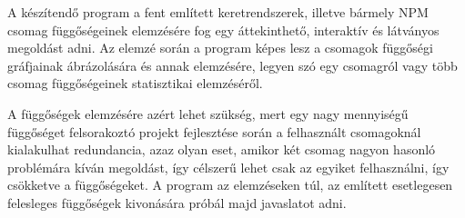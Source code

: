 A készítendő program a fent említett keretrendszerek, illetve bármely NPM csomag függőségeinek elemzésére fog egy áttekinthető, interaktív és látványos megoldást adni. Az elemzé során a program képes lesz a csomagok függőségi gráfjainak ábrázolására és annak elemzésére, legyen szó egy csomagról vagy több csomag függőségeinek statisztikai elemzéséről.

A függőségek elemzésére azért lehet szükség, mert egy nagy mennyiségű függőséget felsorakoztó projekt fejlesztése során a felhasznált csomagoknál kialakulhat redundancia, azaz olyan eset, amikor két csomag nagyon hasonló problémára kíván megoldást, így célszerű lehet csak az egyiket felhasználni, így csökketve a függőségeket. A program az elemzéseken túl, az említett esetlegesen felesleges függőségek kivonására próbál majd javaslatot adni.
